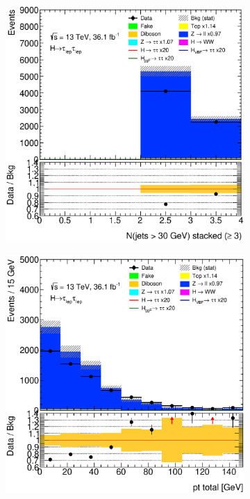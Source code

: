\begin{figure}[htb]
\begin{subfigure}[t]{0.3\textwidth}
    \end{subfigure}
    \begin{subfigure}[t]{0.3\textwidth}
        \includegraphics[width=\textwidth]{./plots/mva/modeling/input_vars/VBF_CR/ll-CutMVAVBFCatZllCR-nJets30Stacked3-lin.eps}
    \end{subfigure}
    \begin{subfigure}[t]{0.3\textwidth}
        \includegraphics[width=\textwidth]{./plots/mva/modeling/input_vars/VBF_CR/ll-CutMVAVBFCatZllCR-PtTotal-lin.eps}

\end{subfigure}
\end{figure}
